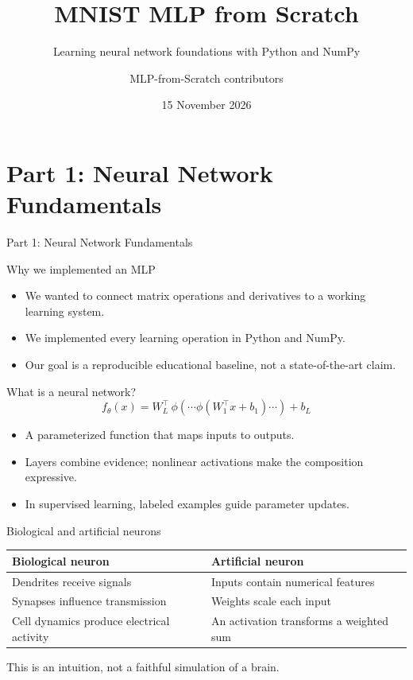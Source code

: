 \documentclass[aspectratio=169,10pt]{beamer}
\title{MNIST MLP from Scratch}
\subtitle{Learning neural network foundations with Python and NumPy}
\author{MLP-from-Scratch contributors}
\date{15 November 2026}
\begin{document}
\begin{frame}\titlepage\end{frame}
\section{Part 1: Neural Network Fundamentals}
\begin{frame}{Part 1: Neural Network Fundamentals}
\tableofcontents[currentsection]\end{frame}

\begin{frame}{Why we implemented an MLP}
\begin{itemize}
\item We wanted to connect matrix operations and derivatives to a working learning system.
\item We implemented every learning operation in Python and NumPy.
\item Our goal is a reproducible educational baseline, not a state-of-the-art claim.
\end{itemize}
\end{frame}

\begin{frame}{What is a neural network?}
\[f_{\theta}(x)=W_L^{\top}\,\phi(\cdots\phi(W_1^{\top}x+b_1)\cdots)+b_L\]\begin{itemize}
\item A parameterized function that maps inputs to outputs.
\item Layers combine evidence; nonlinear activations make the composition expressive.
\item In supervised learning, labeled examples guide parameter updates.
\end{itemize}

\end{frame}

\begin{frame}{Biological and artificial neurons}
\begin{tabular}{p{}p{}}\toprule Biological neuron & Artificial neuron\\\midrule Dendrites receive signals & Inputs contain numerical features\\[6pt] Synapses influence transmission & Weights scale each input\\[6pt] Cell dynamics produce electrical activity & An activation transforms a weighted sum\\\bottomrule\end{tabular}\par\vspace{10pt}This is an intuition, not a faithful simulation of a brain.\end{frame}
\end{document}
